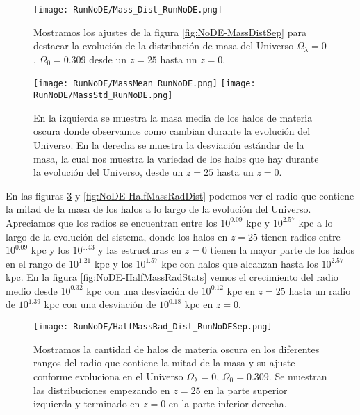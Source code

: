 \begin{figure}[H]
    \centering
    \texttt{[image: RunNoDE/Mass\_Dist\_RunNoDE.png]}
    \caption[Comparación de distribución de masa]{\footnotesize Mostramos los ajustes de la figura \ref{fig:NoDE-MassDistSep} para destacar la evolución de la distribución de masa del Universo $\Omega_\lambda = 0$, $\Omega_0 = 0.309$ desde un $z=25$ hasta un $z=0$.}
    \label{fig:NoDE-MassDist}
\end{figure}

\begin{figure}[H]
    \centering
    \texttt{[image: RunNoDE/MassMean\_RunNoDE.png]}
    \texttt{[image: RunNoDE/MassStd\_RunNoDE.png]}
    \caption[Media y desviación estándar de la distribución de masa]{\footnotesize En la izquierda se muestra la masa media de los halos de materia oscura donde observamos como cambian durante la evolución del Universo. En la derecha se muestra la desviación estándar de la masa, la cual nos muestra la variedad de los halos que hay durante la evolución del Universo, desde un $z=25$ hasta un $z=0$.}
    \label{fig:NoDE-MassStats}
\end{figure}

En las figuras \ref{fig:NoDE-HalfMassRadDistSep} y \ref{fig:NoDE-HalfMassRadDist} podemos ver el radio que contiene la mitad de la masa de los halos a lo largo de la evolución del Universo. Apreciamos que los radios se encuentran entre los $10^{0.09}$ kpc y $10^{2.57}$ kpc a lo largo de la evolución del sistema, donde los halos en $z=25$ tienen radios entre $10^{0.09}$ kpc y los $10^{0.43}$ y las estructuras en $z=0$ tienen la mayor parte de los halos en el rango de $10^{1.21}$ kpc y los $10^{1.57}$ kpc con halos que alcanzan hasta los $10^{2.57}$ kpc. En la figura \ref{fig:NoDE-HalfMassRadStats} vemos el crecimiento del radio medio desde $10^{0.32}$ kpc con una desviación de $10^{0.12}$ kpc en $z=25$ hasta un radio de $10^{1.39}$ kpc con una desviación de $10^{0.18}$ kpc en $z=0$.

\begin{figure}[H]
    \centering
    \texttt{[image: RunNoDE/HalfMassRad\_Dist\_RunNoDESep.png]}
    \caption[Radio que contiene la mitad de la masa]{\footnotesize Mostramos la cantidad de halos de materia oscura en los diferentes rangos del radio que contiene la mitad de la masa y su ajuste conforme evoluciona en el Universo $\Omega_\lambda = 0$, $\Omega_0 = 0.309$. Se muestran las distribuciones empezando en $z=25$ en la parte superior izquierda y terminado en $z=0$ en la parte inferior derecha.}
    \label{fig:NoDE-HalfMassRadDistSep}
\end{figure}

